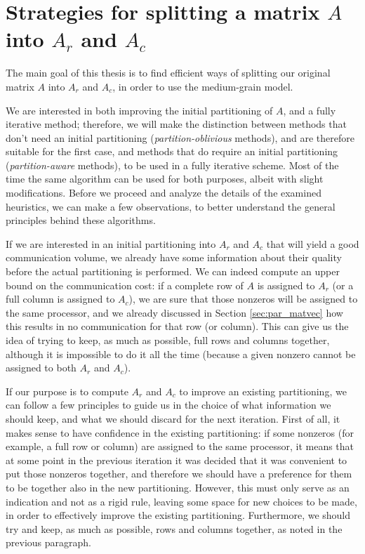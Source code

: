 \chapter{Strategies for splitting a matrix $A$ into $A_r$ and $A_c$} \label{chap:methods}

The main goal of this thesis is to find efficient ways of splitting our original matrix $A$ into $A_r$ and $A_c$, in order to use the medium-grain model.

We are interested in both improving the initial partitioning of $A$, and a fully iterative method; therefore, we will make the distinction between methods that don't need an initial partitioning (\emph{partition-oblivious} methods), and are therefore suitable for the first case, and methods that do require an initial partitioning (\emph{partition-aware} methods), to be used in a fully iterative scheme. Most of the time the same algorithm can be used for both purposes, albeit with slight modifications.  Before we proceed and analyze the details of the examined heuristics, we can make a few observations, to better understand the general principles behind these algorithms.

If we are interested in an initial partitioning into $A_r$ and $A_c$ that will yield a good communication volume, we already have some information about their quality before the actual partitioning is performed. We can indeed compute an upper bound on the communication cost: if a complete row of $A$ is assigned to $A_r$ (or a full column is assigned to $A_c$), we are sure that those nonzeros will be assigned to the same processor, and we already discussed in Section \ref{sec:par_matvec} how this results in no communication for that row (or column). This can give us the idea of trying to keep, as much as possible, full rows and columns together, although it is impossible to do it all the time (because a given nonzero cannot be assigned to both $A_r$ and $A_c$).

If our purpose is to compute $A_r$ and $A_c$ to improve an existing partitioning, we can follow a few principles to guide us in the choice of what information we should keep, and what we should discard for the next iteration. First of all, it makes sense to have confidence in the existing partitioning: if some nonzeros (for example, a full row or column) are assigned to the same processor, it means that at some point in the previous iteration it was decided that it was convenient to put those nonzeros together, and therefore we should have a preference for them to be together also in the new partitioning. However, this must only serve as an indication and not as a rigid rule, leaving some space for new choices to be made, in order to effectively improve the existing partitioning. Furthermore, we should try and keep, as much as possible, rows and columns together, as noted in the previous paragraph.

